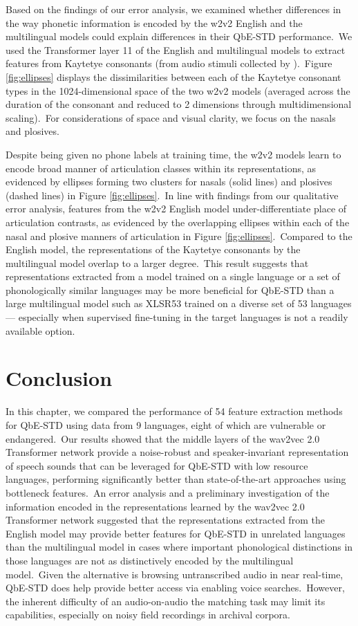 \documentclass[main.tex]{subfiles}
\begin{document}
Based on the findings of our error analysis, we examined whether differences in the way phonetic information is encoded by the w2v2 English and the multilingual models could explain differences in their QbE-STD performance.~We used the Transformer layer 11 of the English and multilingual models to extract features from Kaytetye consonants (from audio stimuli collected by \cite{harvey2015contrastive}).~Figure \ref{fig:ellipses} displays the dissimilarities between each of the Kaytetye consonant types in the 1024-dimensional space of the two w2v2 models (averaged across the duration of the consonant and reduced to 2 dimensions through multidimensional scaling).~For considerations of space and visual clarity, we focus on the nasals and plosives.

Despite being given no phone labels at training time, the w2v2 models learn to encode broad manner of articulation classes within its representations, as evidenced by ellipses forming two clusters for nasals (solid lines) and plosives (dashed lines) in Figure \ref{fig:ellipses}.~In line with findings from our qualitative error analysis, features from the w2v2 English model under-differentiate place of articulation contrasts, as evidenced by the overlapping ellipses within each of the nasal and plosive manners of articulation in Figure \ref{fig:ellipses}.~Compared to the English model, the representations of the Kaytetye consonants by the multilingual model overlap to a larger degree.~This result suggests that representations extracted from a model trained on a single language or a set of phonologically similar languages may be more beneficial for QbE-STD than a large multilingual model such as XLSR53 trained on a diverse set of 53 languages --- especially when supervised fine-tuning in the target languages is not a readily available option.

\section{Conclusion}

In this chapter, we compared the performance of 54 feature extraction methods for QbE-STD using data from 9 languages, eight of which are vulnerable or endangered.~Our results showed that the middle layers of the wav2vec 2.0 Transformer network provide a noise-robust and speaker-invariant representation of speech sounds that can be leveraged for QbE-STD with low resource languages, performing significantly better than state-of-the-art approaches using bottleneck features.~An error analysis and a preliminary investigation of the information encoded in the representations learned by the wav2vec 2.0 Transformer network suggested that the representations extracted from the English model may provide better features for QbE-STD in unrelated languages than the multilingual model in cases where important phonological distinctions in those languages are not as distinctively encoded by the multilingual model.~Given the alternative is browsing untranscribed audio in near real-time, QbE-STD does help provide better access via enabling voice searches.~However, the inherent difficulty of an audio-on-audio the matching task may limit its capabilities, especially on noisy field recordings in archival corpora.
\end{document}
